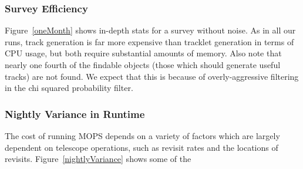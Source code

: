 \subsubsection{Survey Efficiency}
Figure~\ref{oneMonth} shows in-depth stats for a survey without noise.
As in all our runs, track generation is far more expensive than
tracklet generation in terms of CPU usage, but both require
substantial amounts of memory.  Also note that nearly one fourth of
the findable objects (those which should generate useful tracks) are
not found.  We expect that this is because of overly-aggressive
filtering in the chi squared probability filter.


\subsubsection{Nightly Variance in Runtime}

The cost of running MOPS depends on a variety of factors which are
largely dependent on telescope operations, such as revisit rates and
the locations of revisits.  Figure~\ref{nightlyVariance} shows some of
the 


